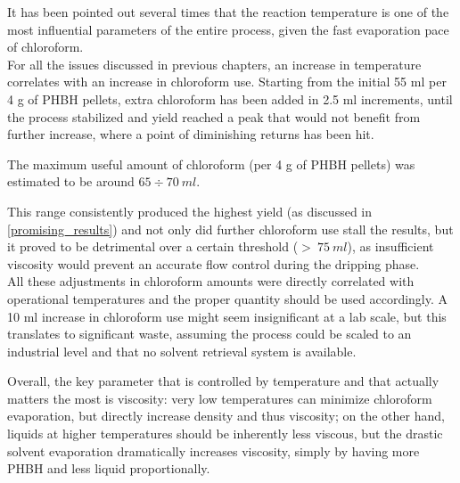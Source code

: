 \documentclass{article}
\begin{document}
        It has been pointed out several times that the reaction temperature is one of the most 
        influential parameters of the entire process, given the fast evaporation pace of chloroform. \\  

        For all the issues discussed in previous chapters, an increase in temperature correlates with an increase in 
        chloroform use. Starting from the initial 55 ml per 4 g of PHBH pellets, extra chloroform has been added 
        in 2.5 ml increments, until the process stabilized and yield reached a peak that would not benefit from further 
        increase, where a point of diminishing returns has been hit. 
 
        The maximum useful amount of chloroform (per 4 g of PHBH pellets) was estimated to be around $65 \div 70 \ ml$. 

        This range consistently produced the highest yield (as discussed in \ref{promising_results}) and not only did further chloroform use stall the 
        results, but it proved to be detrimental over a certain threshold ($ > \ 75 \ ml$), as insufficient 
        viscosity would prevent an accurate flow control during the dripping phase. \\ 

        All these adjustments in chloroform amounts were directly correlated with operational temperatures and the proper quantity should 
        be used accordingly. A 10 ml 
        increase in chloroform use might seem insignificant at a lab scale, but this translates to significant waste, 
        assuming the process could be scaled to an industrial level and that no solvent retrieval system is available. 


        Overall, the key parameter that is controlled by temperature and that actually matters the most is viscosity: 
        very low temperatures can minimize chloroform evaporation, 
        but directly increase density and thus viscosity; on the other hand, liquids at higher temperatures should be inherently 
        less viscous, but the drastic solvent evaporation dramatically increases viscosity, simply by having more PHBH and less 
        liquid proportionally. \\ 
        
\end{document}
